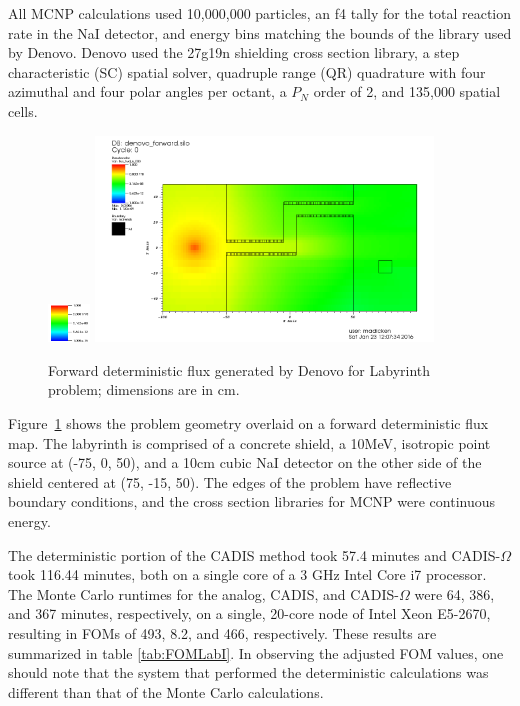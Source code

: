 \documentclass[12pt]{article}
\begin{document}
All MCNP calculations used 10,000,000 particles, an f4 tally for the total reaction rate in the NaI detector, and energy bins matching the bounds of the library used by Denovo. 
Denovo used the 27g19n shielding cross section library, a step characteristic (SC) spatial solver, quadruple range (QR) quadrature with four azimuthal and four polar angles per octant, a $P_N$ order of 2, and 135,000 spatial cells.%

\begin{figure}
  \begin{center}
    \includegraphics[width=0.10\textwidth]{./images/scale.png}
    \includegraphics[width=0.80\textwidth]{./images/maze2_forward_group00_adjusted.png}
    \caption[]{\label{fig::fwdflux}Forward deterministic flux generated by Denovo for Labyrinth problem; dimensions are in cm.}
  \end{center}
\end{figure}
Figure~\ref{fig::fwdflux} shows the problem geometry overlaid on a forward deterministic flux map. The labyrinth is comprised of a concrete shield, a 10MeV, isotropic point source at (-75, 0, 50), and a 10cm cubic NaI detector on the other side of the shield centered at (75, -15, 50). The edges of the problem have reflective boundary conditions, and the cross section libraries for MCNP were continuous energy. 

The deterministic portion of the CADIS method took 57.4 minutes and CADIS-$\Omega$ took 116.44 minutes, both on a single core of a 3 GHz Intel Core i7 processor. The Monte Carlo runtimes for the analog, CADIS, and CADIS-$\Omega$ were 64, 386, and 367 minutes, respectively, on a single, 20-core node of Intel Xeon E5-2670, resulting in FOMs of 493, 8.2, and 466, respectively. These results are summarized in table \ref{tab:FOMLabI}. In observing the adjusted FOM values, one should note that the system that performed the deterministic calculations was different than that of the Monte Carlo calculations. 
\end{document}

